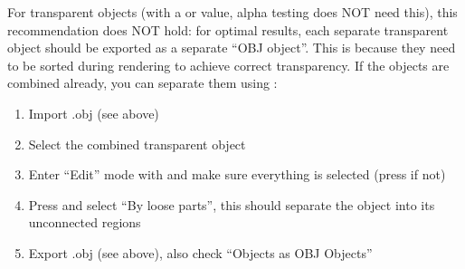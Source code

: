 \noindent For transparent objects (with a  or  value, alpha testing does
NOT need this), this recommendation does NOT hold: for optimal
results, each separate transparent object should be exported as a
separate ``OBJ object''. This is because they need to be sorted during
rendering to achieve correct transparency. If the objects are combined
already, you can separate them using :

\begin{enumerate}
\item Import .obj (see above)
\item Select the combined transparent object
\item Enter ``Edit'' mode with \key{\tab} and make sure everything is selected (press  if not)
\item Press  and select ``By loose parts'', this should separate the object into its unconnected regions
\item Export .obj (see above), also check ``Objects as OBJ Objects''
\end{enumerate}

